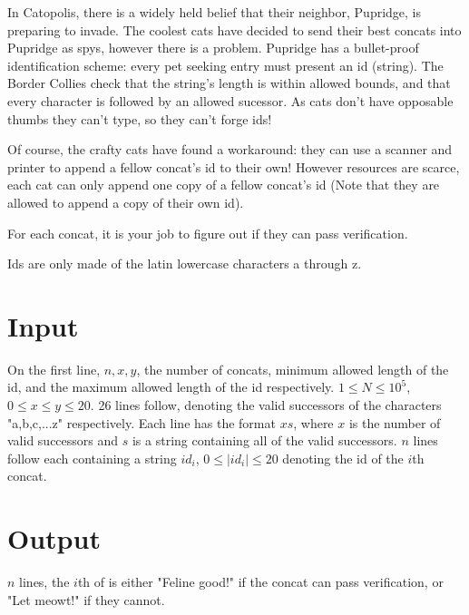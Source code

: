 
In Catopolis, there is a widely held belief that their neighbor, Pupridge, is preparing to invade. The coolest cats have decided to send their best concats into Pupridge as spys, however there is a problem. Pupridge has a bullet-proof identification scheme: every pet seeking entry must present an id (string). The Border Collies check that the string's length is within allowed bounds, and that every character is followed by an allowed sucessor. As cats don't have opposable thumbs they can't type, so they can't forge ids!

\medskip

Of course, the crafty cats have found a workaround: they can use a scanner and printer to append a fellow concat's id to their own! However resources are scarce, each cat can only append one copy of a fellow concat's id (Note that they are allowed to append a copy of their own id).

\medskip

For each concat, it is your job to figure out if they can pass verification.

Ids are only made of the latin lowercase characters a through z.

\section*{Input}
On the first line, $n, x, y$, the number of concats, minimum allowed length of the id, and the maximum allowed length of the id respectively. $1 \leq N \leq 10^5$, $0 \leq x \leq y \leq 20$.
26 lines follow, denoting the valid successors of the characters "a,b,c,...z" respectively. Each line has the format $x s$, where $x$ is the number of valid successors and $s$ is a string containing all of the valid successors.
$n$ lines follow each containing a string $id_i$, $0 \leq |id_i| \leq 20$ denoting the id of the $i$th concat.

\section*{Output}
$n$ lines, the $i$th of is either "Feline good!" if the concat can pass verification, or "Let meowt!" if they cannot.
